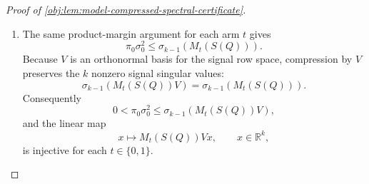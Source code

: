 \documentclass[11pt]{article}
\begin{document}
\begin{proof}[Proof of \cref{obj:lem:model-compressed-spectral-certificate}]
\begin{enumerate}
Also,
\[
M_t(S(Q))^\top
=
B\Xi_t^\top
=
V\Upsilon\Xi_t^\top ,
\]
so the row space of each \(M_t(S(Q))\) is contained in \(\operatorname{range}(V)\).  For \(t=0\), latent-arm positivity in \cref{obj:ass:latent-arm-positivity} gives
\[
\Gamma_0(u,u)=\frac{Q(U=u,T=0)}{Q(T=0)}\ge \pi_0
\]
for every \(u\), since \(Q(U=u,T=0)\ge\pi_0\) and \(Q(T=0)\le1\).  Combining this with \cref{obj:ass:proxy-rank-margin} and the standard product lower bound for the least signal singular value,
\[
\begin{aligned}
\sigma_{k-1}\!\left(M_0(S(Q))\right)
&=
\sigma_{k-1}\!\left(A_0\Gamma_0B^\top\right)  \\
&\ge
\sigma_{k-1}(A_0)\,\sigma_{k-1}(\Gamma_0)\,\sigma_{k-1}(B)
\ge
\pi_0\sigma_0^2 .
\end{aligned}
\]
Thus \(M_0(S(Q))\) has row rank \(k\).  Its row space is contained in the \(k\)-dimensional space \(\operatorname{range}(V)\), hence
\[
\operatorname{range}\!\left(M_0(S(Q))^\top\right)=\operatorname{range}(V).
\]
Since the row space of \(M_1(S(Q))\) is contained in the same space, the signal row space of \(S(Q)\) equals
\[
\operatorname{range}\!\left(M_0(S(Q))^\top\right)
+
\operatorname{range}\!\left(M_1(S(Q))^\top\right)
=
\operatorname{range}(V).
\]
Thus \(V\) spans the signal row space of \(S(Q)\).

\item
The same product-margin argument for each arm \(t\) gives
\[
\pi_0\sigma_0^2
\le
\sigma_{k-1}\!\left(M_t(S(Q))\right).
\]
Because \(V\) is an orthonormal basis for the signal row space, compression by \(V\) preserves the \(k\) nonzero signal singular values:
\[
\sigma_{k-1}\!\left(M_t(S(Q))V\right)
=
\sigma_{k-1}\!\left(M_t(S(Q))\right).
\]
Consequently
\[
0<\pi_0\sigma_0^2
\le
\sigma_{k-1}\!\left(M_t(S(Q))V\right),
\]
and the linear map
\[
x\longmapsto M_t(S(Q))Vx,\qquad x\in\mathbb R^k,
\]
is injective for each \(t\in\{0,1\}\).


\end{enumerate}
\end{proof}
\end{document}

